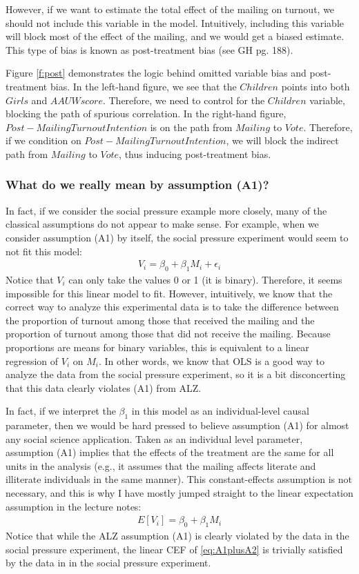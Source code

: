 \documentclass{article}
\begin{document}
However, if we want to estimate the total effect of the mailing on turnout, we should not include this variable in the model. Intuitively, including this variable will block most of the effect of the mailing, and we would get a biased estimate. This type of bias is known as post-treatment bias (see GH pg. 188). 

Figure \ref{f:post} demonstrates the logic behind omitted variable bias and post-treatment bias. In the left-hand figure, we see that the $Children$ points into both $Girls$ and $AAUWscore$. Therefore, we need to control for the $Children$ variable, blocking the path of spurious correlation. In the right-hand figure, $Post-Mailing Turnout Intention$ is on the path from $Mailing$ to $Vote$. Therefore, if we condition on $Post-Mailing Turnout Intention$, we will block the indirect path from $Mailing$ to $Vote$, thus inducing post-treatment bias. 

\subsubsection{What do we really mean by assumption (A1)?}

In fact, if we consider the social pressure example more closely, many of the classical assumptions do not appear to make sense. For example, when we consider assumption (A1) by itself, the social pressure experiment would seem to not fit this model:
\begin{align*}
V_i = \beta_0 + \beta_1 M_i + \epsilon_i
\end{align*}
Notice that $V_i$ can only take the values 0 or 1 (it is binary). Therefore, it seems impossible for this linear model to fit. However, intuitively, we know that the correct way to analyze this experimental data is to take the difference between the proportion of turnout among those that received the mailing and the proportion of turnout among those that did not receive the mailing. Because proportions are means for binary variables, this is equivalent to a linear regression of $V_i$ on $M_i$. In other words, we know that OLS is a good way to analyze the data from the social pressure experiment, so it is a bit disconcerting that this data clearly violates (A1) from ALZ.

In fact, if we interpret the $\beta_1$ in this model as an individual-level causal parameter, then we would be hard pressed to believe assumption (A1) for almost any social science application. Taken as an individual level parameter, assumption (A1) implies that the effects of the treatment are the same for all units in the analysis (e.g., it assumes that the mailing affects literate and illiterate individuals in the same manner). This constant-effects assumption is not necessary, and this is why I have mostly jumped straight to the linear expectation assumption in the lecture notes: 
\begin{align}\label{eq:A1plusA2}
E[V_i] = \beta_0 + \beta_1 M_i
\end{align}
Notice that while the ALZ assumption (A1) is clearly violated by the data in the social pressure experiment, the linear CEF of \eqref{eq:A1plusA2} is trivially satisfied by the data in in the social pressure experiment. 
\end{document}
